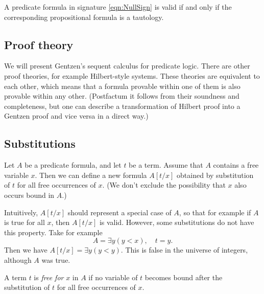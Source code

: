 \begin{page}

\begin{thm}
A predicate formula in signature \eqref{eqn:NullSign} is valid if and only if the corresponding propositional formula is a tautology.
\end{thm}

\end{page}

\begin{page}

\section{Proof theory}
We will present Gentzen's sequent calculus for predicate logic.
There are other proof theories, for example Hilbert-style systems.
These theories are equivalent to each other, which means that a formula provable within one of them is also provable within any other.
(Postfactum it follows from their soundness and completeness,
but one can describe a transformation of Hilbert proof into a Gentzen proof and vice versa in a direct way.)


\subsection{Substitutions}
Let $A$ be a predicate formula, and let $t$ be a term.
Assume that $A$ contains a free variable $x$.
Then we can define a new formula $A[t/x]$ obtained by substitution of $t$ for all free occurrences of $x$.
(We don't exclude the possibility that $x$ also occurs bound in $A$.)

Intuitively, $A[t/x]$ should represent a special case of $A$, so that for example if $A$ is true for all $x$, then $A[t/x]$ is valid.
However, some substitutions do not have this property.
Take for example
\[
A = \exists y (y < x), \quad t = y.
\]
Then we have $A[t/x] = \exists y (y < y)$.
This is false in the universe of integers, although $A$ was true.


\end{page}

\begin{page}

\begin{dfn}
A term $t$ is \emph{free for} $x$ in $A$ if no variable of $t$ becomes bound after the substitution of $t$ for all free occurrences of $x$.
\end{dfn}

\end{page}

